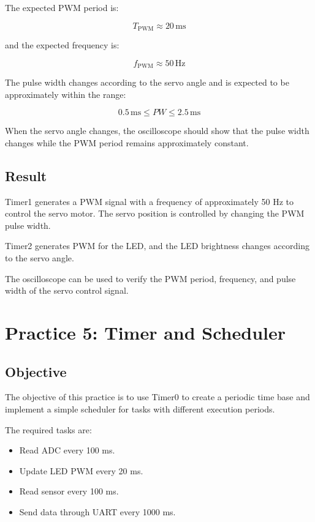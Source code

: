 \documentclass[12pt,a4paper]{article}
\begin{document}
The expected PWM period is:

\[
T_{\mathrm{PWM}}
\approx
20\,\mathrm{ms}
\]

and the expected frequency is:

\[
f_{\mathrm{PWM}}
\approx
50\,\mathrm{Hz}
\]

The pulse width changes according to the servo angle and is expected
to be approximately within the range:

\[
0.5\,\mathrm{ms}
\leq
PW
\leq
2.5\,\mathrm{ms}
\]

When the servo angle changes, the oscilloscope should show that the
pulse width changes while the PWM period remains approximately
constant.

\subsection{Result}

Timer1 generates a PWM signal with a frequency of approximately 50 Hz
to control the servo motor. The servo position is controlled by
changing the PWM pulse width.

Timer2 generates PWM for the LED, and the LED brightness changes
according to the servo angle.

The oscilloscope can be used to verify the PWM period, frequency, and
pulse width of the servo control signal.


\section{Practice 5: Timer and Scheduler}

\subsection{Objective}

The objective of this practice is to use Timer0 to create a periodic
time base and implement a simple scheduler for tasks with different
execution periods.

The required tasks are:

\begin{itemize}
    \item Read ADC every 100 ms.
    \item Update LED PWM every 20 ms.
    \item Read sensor every 100 ms.
    \item Send data through UART every 1000 ms.
\end{itemize}
\end{document}
